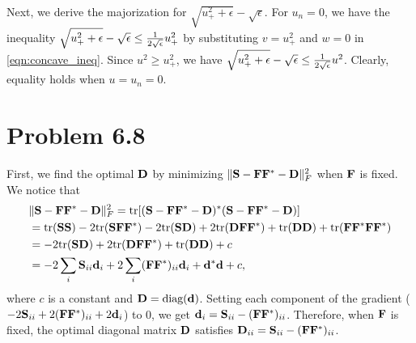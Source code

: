 \documentclass{scrartcl}
\begin{document}
Next, we derive the majorization for $\sqrt{u_+^2+\epsilon}-\sqrt{\epsilon}$. For $u_n = 0$, we have the inequality
$\sqrt{u_+^2+\epsilon}-\sqrt{\epsilon} \le {1 \over 2 \sqrt{\epsilon}}u_+^2$ by substituting $v=u_+^2$ and $w=0$ in \eqref{eqn:concave_ineq}.
Since $u^2 \ge u_+^2$, we have $\sqrt{u_+^2+\epsilon}-\sqrt{\epsilon} \le {1 \over 2 \sqrt{\epsilon}}u^2$. Clearly, equality holds when $u=u_n=0$.


\section*{Problem 6.8}

First, we find the optimal $\mathbf{D}$ by minimizing $\|\mathbf{S}-\mathbf{F}\mathbf{F}^*-\mathbf{D}\|_F^2$ when $\mathbf{F}$ is fixed. We notice that
\begin{equation}
\begin{split}
& \|\mathbf{S}-\mathbf{F}\mathbf{F}^*-\mathbf{D}\|_F^2  = \mathrm{tr} [(\mathbf{S}-\mathbf{F}\mathbf{F}^*-\mathbf{D})^*(\mathbf{S}-\mathbf{F}\mathbf{F}^*-\mathbf{D})] \\
& = \mathrm{tr}(\mathbf{S}\mathbf{S}) - 2\mathrm{tr}(\mathbf{S}\mathbf{F}\mathbf{F}^*) - 2\mathrm{tr}(\mathbf{S}\mathbf{D}) + 2\mathrm{tr}(\mathbf{D}\mathbf{F}\mathbf{F}^*) + \mathrm{tr}(\mathbf{D}\mathbf{D}) + \mathrm{tr}(\mathbf{F}\mathbf{F}^*\mathbf{F}\mathbf{F}^*) \\
& = - 2\mathrm{tr}(\mathbf{S}\mathbf{D}) + 2\mathrm{tr}(\mathbf{D}\mathbf{F}\mathbf{F}^*) + \mathrm{tr}(\mathbf{D}\mathbf{D}) + c \\
& = -2 \sum_i \mathbf{S}_{ii}\mathbf{d}_i + 2 \sum_i (\mathbf{F}\mathbf{F}^*)_{ii}\mathbf{d}_i + \mathbf{d}^*\mathbf{d} + c,
\end{split}
\end{equation}
where $c$ is a constant and $\mathbf{D} = \text{diag}(\mathbf{d})$. Setting each component of the gradient ($-2\mathbf{S}_{ii}+2(\mathbf{F}\mathbf{F}^*)_{ii}+2\mathbf{d}_i$) to 0, we get
$\mathbf{d}_i = \mathbf{S}_{ii} - (\mathbf{F}\mathbf{F}^*)_{ii}$. Therefore, when $\mathbf{F}$ is fixed, the optimal diagonal matrix $\mathbf{D}$ satisfies
$\mathbf{D}_{ii} = \mathbf{S}_{ii} - (\mathbf{F}\mathbf{F}^*)_{ii}$.
\end{document}
